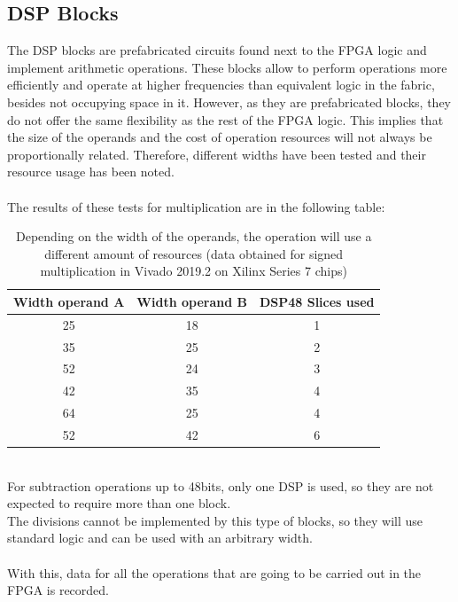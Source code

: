 \subsection{DSP Blocks}
The DSP blocks are prefabricated circuits found next to the FPGA logic and implement arithmetic operations. These blocks allow to perform operations more efficiently and operate at higher frequencies than equivalent logic in the fabric, besides not occupying space in it. However, as they are prefabricated blocks, they do not offer the same flexibility as the rest of the FPGA logic. This implies that the size of the operands and the cost of operation resources will not always be proportionally related. Therefore, different widths have been tested and their resource usage has been noted.
\\
\\
\noindent The results of these tests for multiplication are in the following table:
\begin{table}[h!]
\begin{center}
 \begin{tabular}{|c c |c|} 
 \hline
 Width operand A & Width operand B & DSP48 Slices used \\ [0.5ex] 
 \hline\hline
 25 & 18 & 1 \\ 
 \hline
 35 & 25 & 2 \\
 \hline
 52 & 24 & 3 \\
 \hline
 42 & 35 & 4 \\
 \hline
 64 & 25 & 4 \\
 \hline
 52 & 42 & 6 \\
 \hline
\end{tabular}
\caption[DSP usage for multipliers with diferent widths]{Depending on the width of the operands, the operation will use a different amount of resources (data obtained for signed multiplication in Vivado 2019.2 on Xilinx Series 7 chips)}
\end{center}
\end{table}
\\
For subtraction operations up to 48bits, only one DSP is used, so they are not expected to require more than one block.
\\
The divisions cannot be implemented by this type of blocks, so they will use standard logic and can be used with an arbitrary width.
\\
\\
With this, data for all the operations that are going to be carried out in the FPGA is recorded.

